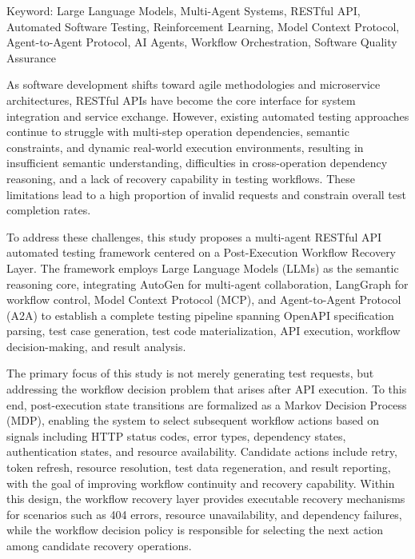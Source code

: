\begin{EnAbstract}
    \begin{EnAbstractItems}
        \noindent \text Keyword: Large Language Models, Multi-Agent Systems, RESTful API, Automated Software Testing, Reinforcement Learning, Model Context Protocol, Agent-to-Agent Protocol, AI Agents, Workflow Orchestration, Software Quality Assurance

    \end{EnAbstractItems}

    \begin{EnAbstractDescription}
        \text As software development shifts toward agile methodologies and microservice architectures, RESTful APIs have become the core interface for system integration and service exchange. However, existing automated testing approaches continue to struggle with multi-step operation dependencies, semantic constraints, and dynamic real-world execution environments, resulting in insufficient semantic understanding, difficulties in cross-operation dependency reasoning, and a lack of recovery capability in testing workflows. These limitations lead to a high proportion of invalid requests and constrain overall test completion rates.
        
        \text To address these challenges, this study proposes a multi-agent RESTful API automated testing framework centered on a Post-Execution Workflow Recovery Layer. The framework employs Large Language Models (LLMs) as the semantic reasoning core, integrating AutoGen for multi-agent collaboration, LangGraph for workflow control, Model Context Protocol (MCP), and Agent-to-Agent Protocol (A2A) to establish a complete testing pipeline spanning OpenAPI specification parsing, test case generation, test code materialization, API execution, workflow decision-making, and result analysis.

        \text The primary focus of this study is not merely generating test requests, but addressing the workflow decision problem that arises after API execution. To this end, post-execution state transitions are formalized as a Markov Decision Process (MDP), enabling the system to select subsequent workflow actions based on signals including HTTP status codes, error types, dependency states, authentication states, and resource availability. Candidate actions include retry, token refresh, resource resolution, test data regeneration, and result reporting, with the goal of improving workflow continuity and recovery capability. Within this design, the workflow recovery layer provides executable recovery mechanisms for scenarios such as 404 errors, resource unavailability, and dependency failures, while the workflow decision policy is responsible for selecting the next action among candidate recovery operations.


\end{EnAbstractDescription}
\end{EnAbstract}
